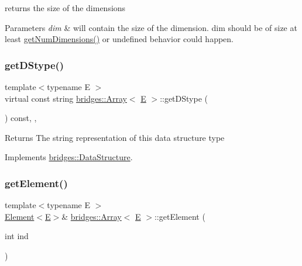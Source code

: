 returns the size of the dimensions 
\begin{DoxyParams}{Parameters}
{\em dim} & will contain the size of the dimension. dim should be of size at least \mbox{\hyperlink{classbridges_1_1_array_a31edfcff05dd4102fee1840ee915319e}{get\+Num\+Dimensions()}} or undefined behavior could happen. \\
\hline
\end{DoxyParams}
\mbox{\label{classbridges_1_1_array_ab93f7379870a7c0bc63490c53d95ba09}} 
\subsubsection{\texorpdfstring{getDStype()}{getDStype()}}
{\footnotesize\ttfamily template$<$typename E $>$ \\
virtual const string \mbox{\hyperlink{classbridges_1_1_array}{bridges\+::\+Array}}$<$ \mbox{\hyperlink{namespacebridges_acfb0a4f7877d8f63de3e6862004c50eda3a3ea00cfc35332cedf6e5e9a32e94da}{E}} $>$\+::get\+D\+Stype (\begin{DoxyParamCaption}{ }\end{DoxyParamCaption}) const\hspace{0.3cm}{\ttfamily [inline]}, {\ttfamily [override]}, {\ttfamily [virtual]}}

\begin{DoxyReturn}{Returns}
The string representation of this data structure type 
\end{DoxyReturn}


Implements \mbox{\hyperlink{classbridges_1_1_data_structure_a957a63b106e340bc753620c650632bdc}{bridges\+::\+Data\+Structure}}.

\mbox{\label{classbridges_1_1_array_ac5ff703692153e1831cbea6edd3007e7}} 
\subsubsection{\texorpdfstring{getElement()}{getElement()}\hspace{0.1cm}{\footnotesize\ttfamily [1/3]}}
{\footnotesize\ttfamily template$<$typename E $>$ \\
\mbox{\hyperlink{classbridges_1_1_element}{Element}}$<$\mbox{\hyperlink{namespacebridges_acfb0a4f7877d8f63de3e6862004c50eda3a3ea00cfc35332cedf6e5e9a32e94da}{E}}$>$\& \mbox{\hyperlink{classbridges_1_1_array}{bridges\+::\+Array}}$<$ \mbox{\hyperlink{namespacebridges_acfb0a4f7877d8f63de3e6862004c50eda3a3ea00cfc35332cedf6e5e9a32e94da}{E}} $>$\+::get\+Element (\begin{DoxyParamCaption}\item[{int}]{ind }\end{DoxyParamCaption})\hspace{0.3cm}{\ttfamily [inline]}}

